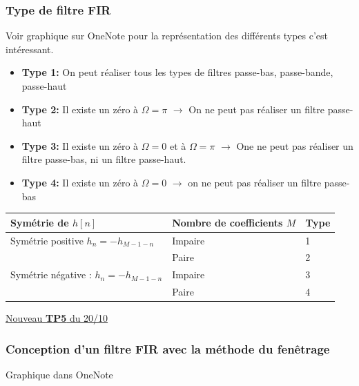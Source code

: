 \documentclass{article}
\theoremstyle{plain}%
\theoremstyle{definition}
\theoremstyle{remark}
\begin{document}
\subsubsection{Type de filtre FIR}
Voir graphique sur OneNote pour la représentation des différents types c'est intéressant.
\begin{itemize}
    \item \textbf{Type 1:} On peut réaliser tous les types de filtres passe-bas, passe-bande, passe-haut
    \item \textbf{Type 2:} Il existe un zéro à $ \Omega = \pi  $ $\rightarrow$ On ne peut pas réaliser un filtre passe-haut
    \item \textbf{Type 3:} Il existe un zéro à $ \Omega = 0 $ et à $ \Omega = \pi  $ $\rightarrow$ One ne peut pas réaliser un filtre passe-bas, ni un filtre passe-haut.
    \item \textbf{Type 4:} Il existe un zéro à $ \Omega = 0 $ $\rightarrow$ on ne peut pas réaliser un filtre passe-bas
\end{itemize}
\begin{table}[!ht]
    \centering
    \begin{tabular}{|l|l|l|}
    \hline
        Symétrie de $h[n]$ & Nombre de coefficients $M$ & Type \\ \hline
        Symétrie positive $ h_n = - h_{M-1-n} $ & Impaire & 1 \\ \hline
        ~ & Paire & 2 \\ \hline
        Symétrie négative : $ h_n = - h_{M-1-n} $  & Impaire & 3 \\ \hline
        ~ & Paire & 4 \\ \hline
    \end{tabular}
\end{table}

\underline{Nouveau \textbf{TP5} du 20/10} \\
\subsubsection{Conception d'un filtre FIR avec la méthode du fenêtrage}

Graphique dans OneNote 
\end{document}
